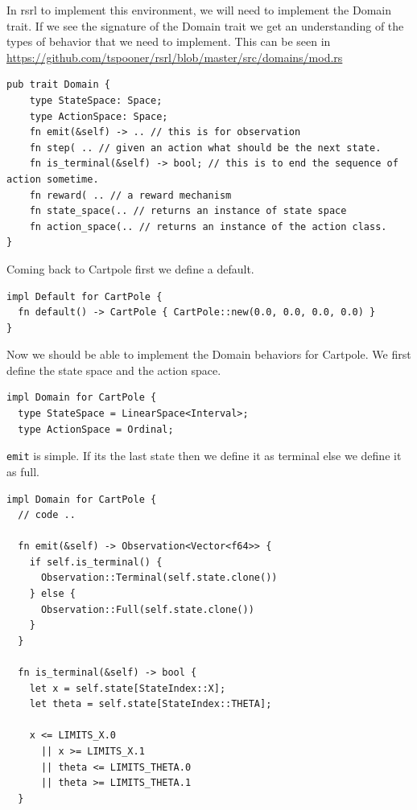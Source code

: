 \documentclass{book}
\begin{document}
In rsrl to implement this environment, we will need to implement the Domain trait. If we see the signature of the Domain trait we get an understanding of the types of behavior that we need to implement. This can be seen in \href{}{https://github.com/tspooner/rsrl/blob/master/src/domains/mod.rs}


\begin{lstlisting}[caption={},basicstyle=\small]
pub trait Domain {
    type StateSpace: Space;
    type ActionSpace: Space;
    fn emit(&self) -> .. // this is for observation
    fn step( .. // given an action what should be the next state.
    fn is_terminal(&self) -> bool; // this is to end the sequence of action sometime.
    fn reward( .. // a reward mechanism
    fn state_space(.. // returns an instance of state space
    fn action_space(.. // returns an instance of the action class.
}
\end{lstlisting}

Coming back to Cartpole first we define a default.

\begin{lstlisting}[caption={chapter3\\/rsrl\_custom\\/src\\/main\\.rs},basicstyle=\small]
impl Default for CartPole {
  fn default() -> CartPole { CartPole::new(0.0, 0.0, 0.0, 0.0) }
}
\end{lstlisting}

Now we should be able to implement the Domain behaviors for Cartpole. We first define the state space and the action space.

\begin{lstlisting}[caption={chapter3\\/rsrl\_custom\\/src\\/main\\.rs},basicstyle=\small]
impl Domain for CartPole {
  type StateSpace = LinearSpace<Interval>;
  type ActionSpace = Ordinal;
\end{lstlisting}

\lstinline{emit} is simple. If its the last state then we define it as terminal else we define it as full.

\begin{lstlisting}[caption={chapter3\\/rsrl\_custom\\/src\\/main\\.rs},basicstyle=\small]
impl Domain for CartPole {
  // code ..

  fn emit(&self) -> Observation<Vector<f64>> {
    if self.is_terminal() {
      Observation::Terminal(self.state.clone())
    } else {
      Observation::Full(self.state.clone())
    }
  }

  fn is_terminal(&self) -> bool {
    let x = self.state[StateIndex::X];
    let theta = self.state[StateIndex::THETA];

    x <= LIMITS_X.0
      || x >= LIMITS_X.1
      || theta <= LIMITS_THETA.0
      || theta >= LIMITS_THETA.1
  }
\end{lstlisting}
\end{document}
